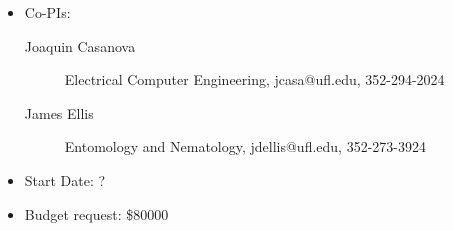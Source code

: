 
\begin{itemize}
\item Co-PIs:
\begin{description}
\item[Joaquin Casanova] Electrical Computer Engineering, jcasa@ufl.edu, 352-294-2024
\item[James Ellis] Entomology and Nematology, jdellis@ufl.edu, 352-273-3924
\end{description}
\item Start Date: ?
\item Budget request: \$80000
\end{itemize}
